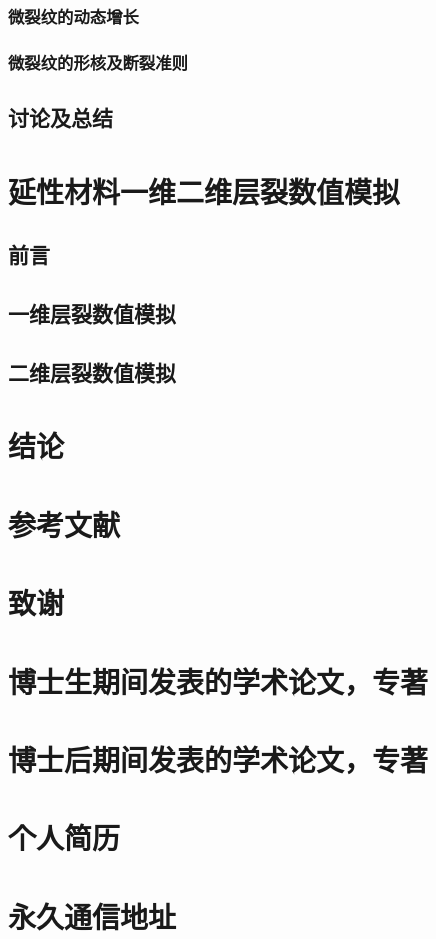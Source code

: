 \documentclass[degree=postdoc]{thuthesis}
\begin{document}
\subsection{微裂纹的动态增长}

\clearpage
\setcounter{page}{124}
\subsection{微裂纹的形核及断裂准则}

\clearpage
\setcounter{page}{125}
\section{讨论及总结}

\clearpage
\setcounter{page}{126}
\chapter{延性材料一维二维层裂数值模拟}
\section{前言}

\clearpage
\setcounter{page}{127}
\section{一维层裂数值模拟}

\clearpage
\setcounter{page}{129}
\section{二维层裂数值模拟}

\clearpage
\setcounter{page}{138}
\chapter{结论}



\backmatter
\setcounter{page}{148}
\chapter{参考文献}
\chapter{致谢}

\clearpage
\setcounter{page}{149}
\chapter{博士生期间发表的学术论文，专著}

\clearpage
\setcounter{page}{150}
\chapter{博士后期间发表的学术论文，专著}

\clearpage
\setcounter{page}{151}
\chapter{个人简历}

\clearpage
\setcounter{page}{152}
\chapter{永久通信地址}


\clearpage
\OMIT
\end{document}
